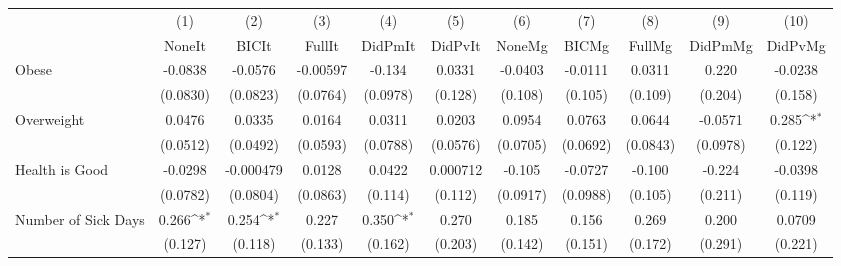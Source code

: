 {
\def\sym#1{\ifmmode^{#1}\else\(^{#1}\)\fi}
\begin{tabular}{l*{10}{c}}
\toprule
            &\multicolumn{1}{c}{(1)}&\multicolumn{1}{c}{(2)}&\multicolumn{1}{c}{(3)}&\multicolumn{1}{c}{(4)}&\multicolumn{1}{c}{(5)}&\multicolumn{1}{c}{(6)}&\multicolumn{1}{c}{(7)}&\multicolumn{1}{c}{(8)}&\multicolumn{1}{c}{(9)}&\multicolumn{1}{c}{(10)}\\
            &\multicolumn{1}{c}{NoneIt}&\multicolumn{1}{c}{BICIt}&\multicolumn{1}{c}{FullIt}&\multicolumn{1}{c}{DidPmIt}&\multicolumn{1}{c}{DidPvIt}&\multicolumn{1}{c}{NoneMg}&\multicolumn{1}{c}{BICMg}&\multicolumn{1}{c}{FullMg}&\multicolumn{1}{c}{DidPmMg}&\multicolumn{1}{c}{DidPvMg}\\
\midrule
Obese       &     -0.0838         &     -0.0576         &    -0.00597         &      -0.134         &      0.0331         &     -0.0403         &     -0.0111         &      0.0311         &       0.220         &     -0.0238         \\
            &    (0.0830)         &    (0.0823)         &    (0.0764)         &    (0.0978)         &     (0.128)         &     (0.108)         &     (0.105)         &     (0.109)         &     (0.204)         &     (0.158)         \\
\addlinespace
Overweight  &      0.0476         &      0.0335         &      0.0164         &      0.0311         &      0.0203         &      0.0954         &      0.0763         &      0.0644         &     -0.0571         &       0.285\sym{*}  \\
            &    (0.0512)         &    (0.0492)         &    (0.0593)         &    (0.0788)         &    (0.0576)         &    (0.0705)         &    (0.0692)         &    (0.0843)         &    (0.0978)         &     (0.122)         \\
\addlinespace
Health is Good&     -0.0298         &   -0.000479         &      0.0128         &      0.0422         &    0.000712         &      -0.105         &     -0.0727         &      -0.100         &      -0.224         &     -0.0398         \\
            &    (0.0782)         &    (0.0804)         &    (0.0863)         &     (0.114)         &     (0.112)         &    (0.0917)         &    (0.0988)         &     (0.105)         &     (0.211)         &     (0.119)         \\
\addlinespace
Number of Sick Days&       0.266\sym{*}  &       0.254\sym{*}  &       0.227         &       0.350\sym{*}  &       0.270         &       0.185         &       0.156         &       0.269         &       0.200         &      0.0709         \\
            &     (0.127)         &     (0.118)         &     (0.133)         &     (0.162)         &     (0.203)         &     (0.142)         &     (0.151)         &     (0.172)         &     (0.291)         &     (0.221)         \\
\bottomrule
\end{tabular}
}

